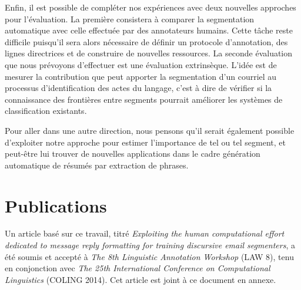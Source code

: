 Enfin, il est possible de compléter nos expériences avec deux nouvelles approches pour l'évaluation. La première consistera à comparer la segmentation automatique avec celle effectuée par des annotateurs humains. Cette tâche reste difficile puisqu'il sera alors nécessaire de définir un protocole d'annotation, des lignes directrices et de construire de nouvelles ressources. La seconde évaluation que nous prévoyons d'effectuer est une évaluation extrinsèque. L'idée est de mesurer la contribution que peut apporter la segmentation d'un courriel au processus d'identification des actes du langage, c'est à dire de vérifier si la connaissance des frontières entre segments pourrait améliorer les systèmes de classification existants.

Pour aller dans une autre direction, nous pensons qu'il serait également possible d'exploiter notre approche pour estimer l'importance de tel ou tel segment, et peut-être lui trouver de nouvelles applications dans le cadre génération automatique de résumés par extraction de phrases.

\section{Publications}

Un article basé sur ce travail, titré \textit{Exploiting the human computational effort dedicated to message reply formatting for training discursive email segmenters}, a été soumis et accepté à \textit{The 8th Linguistic Annotation Workshop} (LAW 8), tenu en conjonction avec \textit{The 25th International Conference on Computational Linguistics} (COLING 2014). Cet article est joint à ce document en annexe.